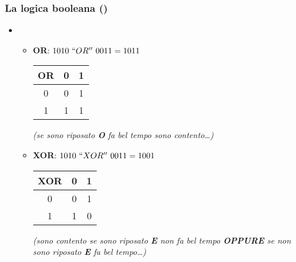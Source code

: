 \begin{frame}
    \frametitle{La logica booleana ()}

	\begin{itemize}[<+- | alert@+->]

		\item[~]

			\begin{itemize}[<+- | alert@+->]
			\setlength{\itemsep}{10mm}

				\item {\bfseries OR}: $1010~``OR''~0011 = 1011$
					\hfill
					\begin{tabular}{c | c c}
						OR & 0 & 1\\
						\hline
						0 & 0 & 1\\
						1 & 1 & 1\\
					\end{tabular}

					{\itshape (se sono riposato {\bfseries O}
					  fa bel tempo sono contento\ldots)}

				\item {\bfseries XOR}: $1010~``XOR''~0011 = 1001$
					\hfill
					\begin{tabular}{c | c c}
						XOR & 0 & 1\\
						\hline
						0 & 0 & 1\\
						1 & 1 & 0\\
					\end{tabular}

					{\itshape (sono contento se sono riposato {\bfseries E}
					 non fa bel tempo {\bfseries OPPURE} se non sono riposato
					 {\bfseries E} fa bel tempo\ldots)}

				\end{itemize}

	\end{itemize}

\end{frame}
